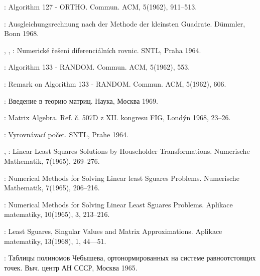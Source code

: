\begin{enumerate}[label={[\arabic*]}]
\item {}: Algorithm 127 - ORTHO. Commun. ACM, 5(1962),
  911--513.

\item {}: Ausgleichungsrechnung nach der Methode der
  kleinsten Guadrate. Dümmler, Bonn 1968.

\item {}, , : Numerické
  řešení diferenciálních rovnic. SNTL, Praha 1964.

\item {}: Algorithm 133 - RANDOM. Commun. ACM,
  5(1962), 553.

\item {}: Remark on Algorithm 133 -
  RANDOM. Commun. ACM, 5(1962), 606.

\item {}: Введение в теорию матриц. Наука, Москва 1969.

\item {}: Matrix Algebra. Ref. č. 507D z
  XII. kongresu FIG, Londýn 1968, 23--26.

\item {}: Vyrovnávací počet. SNTL, Prahe 1964.

\item {}, : Linear Least Squares
  Solutions by Householder Transformations. Numerische Mathematik,
  7(1965), 269--276.

\item {}: Numerical Methods for Solving Linear least
  Sguares Problems. Numerische Mathematik, 7(1965), 206--216.

\item {}: Numerical Methods for Solving Linear Least
  Sguares Problems. Aplikace matematiky, 10(1965), 3, 213--216.


\item {}:  Least Sguares, Singular Values and
  Matrix Approximations. Aplikace matematiky, 13(1968), 1, 44---51.

\item {}: Таблицы полиномов
  Чебышева, ортонормированных на системе равноотстоящих
  точек. Выч. центр АН СССР, Москва 1965.



\end{enumerate}
